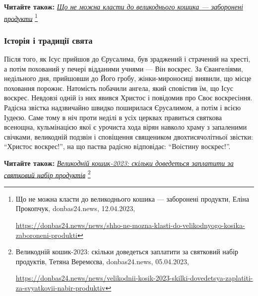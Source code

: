 \textbf{Читайте також:} \href{https://donbas24.news/news/shho-ne-mozna-klasti-do-velikodnyogo-kosika-zaboroneni-produkti}{\emph{Що не можна класти до великоднього кошика — заборонені продукти}}%
\footnote{Що не можна класти до великоднього кошика — заборонені продукти, Еліна Прокопчук, donbas24.news, 12.04.2023, \par%
\url{https://donbas24.news/news/shho-ne-mozna-klasti-do-velikodnyogo-kosika-zaboroneni-produkti}%
}

\subsubsection{Історія і традиції свята}

Після того, як Ісус прийшов до Єрусалима, був зраджений і страчений на хресті,
а потім похований у печері відданими учнями — Він воскрес. За Євангеліями,
недільного дня, прийшовши до Його гробу, жінки-мироносиці виявили, що місце
поховання порожнє. Натомість побачили ангела, який сповістив їм, що Ісус
воскрес. Невдовзі одній із них явився Христос і повідомив про Своє воскресіння.
Радісна звістка надзвичайно швидко поширилася Єрусалимом, а потім і всією
Іудеєю. Саме тому в ніч проти неділі в усіх церквах правиться святкова
всенощна, кульмінацією якої є урочиста хода вірян навколо храму з запаленими
свічками, великодній подзвін і сповіщення священиком двохтисячолітньої звістки:
\enquote{Христос воскрес!}, на що паства радісно відповідає: \enquote{Воістину воскрес!}.


\textbf{Читайте також:} \href{https://donbas24.news/news/velikodnii-kosik-2023-skilki-dovedetsya-zaplatiti-za-svyatkovii-nabir-produktiv}{\emph{Великодній кошик-2023: скільки доведеться заплатити за святковий набір продуктів}}%
\footnote{Великодній кошик-2023: скільки доведеться заплатити за святковий набір продуктів, Тетяна Веремєєва, donbas24.news, 05.04.2023, \par%
\url{https://donbas24.news/news/velikodnii-kosik-2023-skilki-dovedetsya-zaplatiti-za-svyatkovii-nabir-produktiv}%
}

